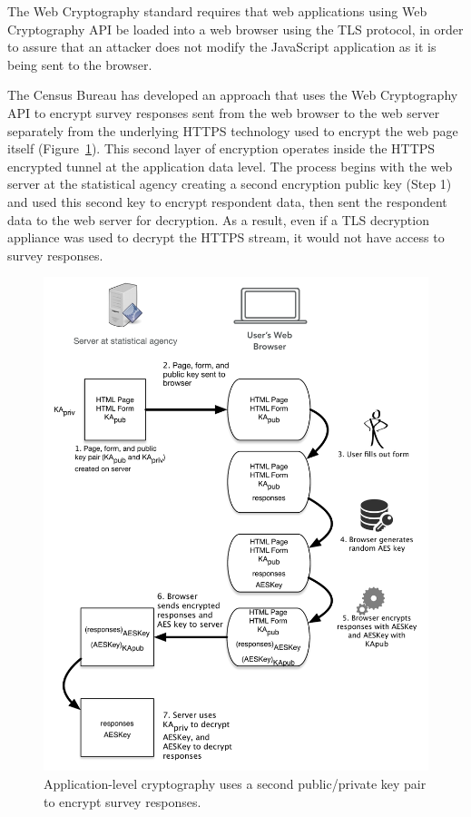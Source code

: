 \documentclass[fleqn,12pt]{wlscirep}
\begin{document}
The Web Cryptography standard requires that web applications using Web
Cryptography API be loaded into a web browser using the TLS protocol, in
order to assure that an attacker does not modify the JavaScript
application as it is being sent to the browser.

The Census Bureau has developed an approach that uses the Web
Cryptography API to encrypt survey responses sent from the
web browser to the web server separately from the underlying HTTPS
technology used to encrypt the web page itself (Figure~\ref{app-level-diagram}). This second layer of encryption
operates inside the HTTPS encrypted tunnel at the application data
level. The process begins with the web server at the statistical
agency creating a second encryption public key (Step 1) and used this second
key to encrypt respondent data, then sent the respondent data to the
web server for decryption. As a result, even if a TLS decryption
appliance was used to decrypt the HTTPS stream, it would not have
access to survey responses.

\begin{figure}
  \includegraphics[width=\linewidth]{art/app-level-diagram}
  \caption{Application-level cryptography uses a second public/private
    key pair to encrypt survey responses.\label{app-level-diagram}}
\end{figure}
\end{document}
